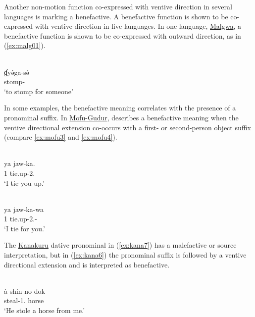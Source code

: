 Another non-motion function co-expres\-sed with ventive direction in several languages is marking a benefactive. A benefactive function is shown to be co-expres\-sed with ventive direction in five languages. In one language, \hyperref[malg]{Malgwa}, a benefactive function is shown to be co-expressed with outward direction, as in (\ref{ex:malg01}).

\ea\label{ex:malg01}
 \\
\gll ɠyə́ga-sə́	\\
stomp-		\\
\glt `to stomp for someone'
\z 

In some examples, the benefactive meaning correlates with the presence of a pronominal suffix. In \hyperref[mofu]{Mofu-Gudur}, \citet[8, 10]{hollingsworthTransitivityPragmaticsObject1995} describes a benefactive meaning when the ventive directional extension co-occurs with a first- or second-person object suffix (compare \ref{ex:mofu3} and \ref{ex:mofu4}).

\ea\label{ex:mofu3}
 \\
\gll ya jaw-ka. \\
1 tie.up-2.	\\
\glt `I tie you up.'

\ex\label{ex:mofu4}
 \\
\gll ya jaw-ka-wa \\
1 tie.up-2.- \\
\glt `I tie for you.'
\z 

The \hyperref[kana]{Kanakuru} dative pronominal in (\ref{ex:kana7}) has a malefactive or source interpretation, but in (\ref{ex:kana6}) the pronominal suffix is followed by a ventive directional extension and is interpreted as benefactive.

\ea\label{ex:kana7}
 \\
\gll  à	shin-no	dok \\
	steal-1.	horse \\
\glt `He stole a horse from me.'


